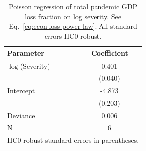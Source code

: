 \begin{table}[h]
\centering
\caption{Poisson regression of total pandemic GDP loss fraction on log severity. See Eq.~\ref{eq:econ-loss-power-law}. All standard errors HC0 robust.}
\label{tab:econ_loss_model_sev_total}
\begin{tabular}{lc}
\hline \hline
Parameter & Coefficient \\
\hline
$\log$(Severity) & 0.401 \\
          & (0.040) \\
Intercept & -4.873 \\
          & (0.203) \\
\hline
Deviance & 0.006 \\
N & 6 \\
\hline
\multicolumn{2}{l}{\footnotesize HC0 robust standard errors in parentheses.} \\
\end{tabular}
\end{table}
